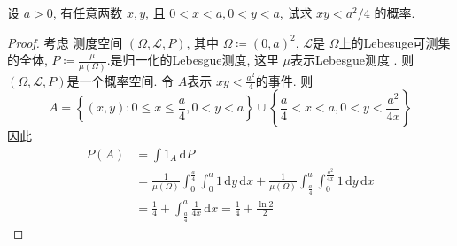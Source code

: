 \documentclass[../main.tex]{subfiles}
\begin{document}
\begin{exercise}{}{}
设 $a>0$, 有任意两数 $x, y$, 且 $0<x<a, 0<y<a$, 试求 $xy<a^2/4$ 的概率.
\end{exercise}

\begin{proof}
    考虑 测度空间 \(  \left(  \Omega , \mathcal{L}, P \right)   \), 其中 \(   \Omega \coloneqq \left( 0,a \right)^{2}   \), \(  \mathcal{L}  \)是 \(   \Omega   \)上的Lebesuge可测集的全体, \(  P  \coloneqq \frac{\mu  }{\mu \left(  \Omega  \right)  } \).是归一化的Lebesgue测度, 这里 \(  \mu   \)表示Lebesgue测度 . 则 \(  \left(  \Omega ,\mathcal{L},P \right)   \)是一个概率空间. 令 \(  A  \)表示 \(  xy< \frac{a^{2} }{4 }   \)的事件. 则 \[
    A= \left\{ \left( x,y \right): 0\le x\le \frac{a }{4 }, 0< y< a  \right\}\cup \left\{ \frac{a }{4 }< x< a, 0< y< \frac{a^{2} }{4x }   \right\}
    \]因此 \[
    \begin{aligned}
    P\left( A \right)&=  \int 1_{A}\,\mathrm{d} P\\ 
     &=  \frac{1 }{\mu \left(  \Omega  \right)  } \int_{0}^{\frac{a }{4 } }  \int_{0}^{a}1 \,\mathrm{d} y \,\mathrm{d} x +  \frac{1 }{\mu \left(  \Omega  \right)  } \int_{\frac{a }{4 } }^{a} \int_{0}^{\frac{a^{2} }{4x } }1 \,\mathrm{d} y \,\mathrm{d} x \\ 
      &= \frac{1 }{4 }+ \int_{\frac{a }{4 } }^{a}\frac{1 }{4x }\,\mathrm{d} x   = \frac{1}{4}+  \frac{ \ln 2}{2} 
    \end{aligned} 
    \]
\end{proof}
\end{document}
